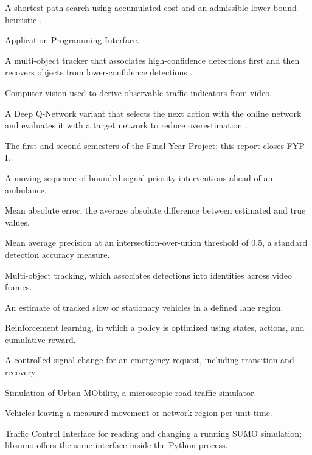 \begin{description}[font=\normalfont,leftmargin=0pt,labelindent=0pt,itemindent=0pt,labelsep=0.45em,itemsep=0pt,parsep=0pt,topsep=0.25\baselineskip]
\item[A*:] A shortest-path search using accumulated cost and an admissible lower-bound heuristic \cite{hart1968astar}.
\item[API:] Application Programming Interface.
\item[ByteTrack:] A multi-object tracker that associates high-confidence detections first and then recovers objects from lower-confidence detections \cite{zhang2022bytetrack}.
\item[CV:] Computer vision used to derive observable traffic indicators from video.
\item[Double DQN:] A Deep Q-Network variant that selects the next action with the online network and evaluates it with a target network to reduce overestimation \cite{vanhasselt2016double}.
\item[FYP-I / FYP-II:] The first and second semesters of the Final Year Project; this report closes FYP-I.
\item[Green corridor:] A moving sequence of bounded signal-priority interventions ahead of an ambulance.
\item[MAE:] Mean absolute error, the average absolute difference between estimated and true values.
\item[mAP50:] Mean average precision at an intersection-over-union threshold of 0.5, a standard detection accuracy measure.
\item[MOT:] Multi-object tracking, which associates detections into identities across video frames.
\item[Queue proxy:] An estimate of tracked slow or stationary vehicles in a defined lane region.
\item[RL:] Reinforcement learning, in which a policy is optimized using states, actions, and cumulative reward.
\item[Signal preemption:] A controlled signal change for an emergency request, including transition and recovery.
\item[SUMO:] Simulation of Urban MObility, a microscopic road-traffic simulator.
\item[Throughput:] Vehicles leaving a measured movement or network region per unit time.
\item[TraCI:] Traffic Control Interface for reading and changing a running SUMO simulation; libsumo offers the same interface inside the Python process.

\end{description}
